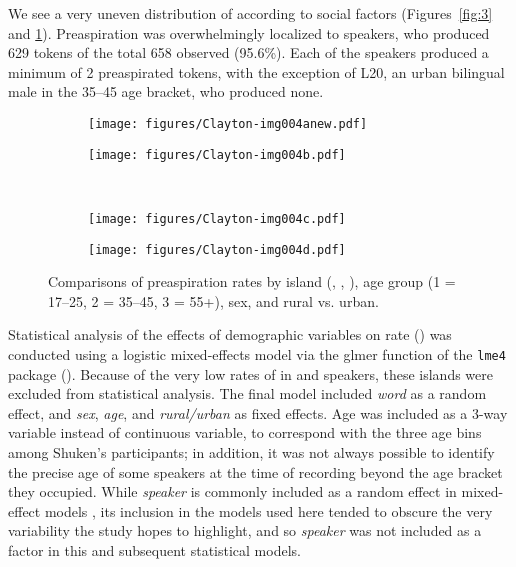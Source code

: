 \documentclass[output=paper,colorlinks,citecolor=brown]{langscibook}
\begin{document}
We see a very uneven distribution of  according to social factors (Figures~\ref{fig:3} and \ref{fig:4}). Preaspiration was overwhelmingly localized to  speakers, who produced 629 tokens of the total 658 observed (95.6\%). Each of the  speakers produced a minimum of 2 preaspirated tokens, with the exception of L20, an urban bilingual male in the 35--45 age bracket, who produced none. 

\begin{figure}
\begin{subfigure}{.5\textwidth}\centering
\texttt{[image: figures/Clayton-img004anew.pdf]}
\caption{}
\end{subfigure}%
\begin{subfigure}{.5\textwidth}\centering
\texttt{[image: figures/Clayton-img004b.pdf]}
\caption{}
\end{subfigure}\medskip\\
\begin{subfigure}{.5\textwidth}\centering
\texttt{[image: figures/Clayton-img004c.pdf]}
\caption{}
\end{subfigure}%
\begin{subfigure}{.5\textwidth}\centering
\texttt{[image: figures/Clayton-img004d.pdf]}
\caption{}
\end{subfigure}
\caption{Comparisons of preaspiration rates by island (, , ), age group (1 = 17--25, 2 = 35--45, 3 = 55+), sex, and rural vs. urban.}
\label{fig:4}
\end{figure}

Statistical analysis of the effects of demographic variables on  rate () was conducted using a logistic mixed-effects model via the glmer function of the \texttt{lme4} package (\citealt{Bates:2015, Kuznetsova:2017}). Because of the very low rates of  in  and  speakers, these islands were excluded from statistical analysis. The final model included \textit{word} as a random effect, and \textit{sex}, \textit{age}, and \textit{rural/urban} as fixed effects. Age was included as a 3-way variable instead of continuous variable, to correspond with the three age bins among Shuken’s participants; in addition, it was not always possible to identify the precise age of some speakers at the time of recording beyond the age bracket they occupied. While \textit{speaker} is commonly included as a random effect in mixed-effect models \citep{Baayen_etal2008_random_effects}, its inclusion in the models used here tended to obscure the very variability the study hopes to highlight, and so \textit{speaker} was not included as a factor in this and subsequent statistical models. 
\end{document}
